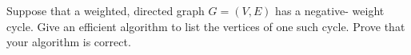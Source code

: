 Suppose that a weighted, directed graph $G = (V,E)$ has a negative-
weight cycle. Give an efficient algorithm to list the vertices of one 
such cycle. Prove that your algorithm is correct.
